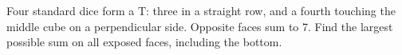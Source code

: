 Four standard dice form a T: three in a straight row, and a fourth touching the middle cube on a perpendicular side. Opposite faces sum to 7. Find the largest possible sum on all exposed faces, including the bottom.

